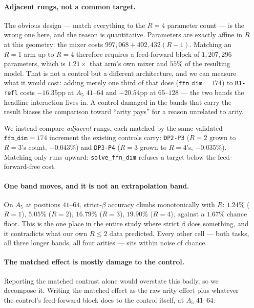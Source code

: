\documentclass[10pt,twocolumn]{article}
\begin{document}
\paragraph{Adjacent rungs, not a common target.} The obvious design --- match
everything to the $R{=}4$ parameter count --- is the wrong one here, and the
reason is quantitative. Parameters are exactly affine in $R$ at this geometry:
the mixer costs $997{,}068 + 402{,}432(R-1)$. Matching an $R{=}1$ arm up to
$R{=}4$ therefore requires a feed-forward block of $1{,}207{,}296$ parameters,
which is $1.21\times$ that arm's own mixer and $55\%$ of the resulting model.
That is not a control but a different architecture, and we can measure what it
would cost: adding merely one third of that dose ($\texttt{ffn\_dim}=174$) to
\texttt{R1-refl} costs $-16.35$pp at $A_5$ $41$--$64$ and $-20.54$pp at
$65$--$128$ --- the two bands the headline interaction lives in. A control
damaged in the bands that carry the result biases the comparison toward
``arity pays'' for a reason unrelated to arity.

We instead compare \emph{adjacent} rungs, each matched by the same validated
$\texttt{ffn\_dim}=174$ increment the existing controls carry: \texttt{DP2-P3}
($R{=}2$ grown to $R{=}3$'s count, $-0.043\%$) and \texttt{DP3-P4} ($R{=}3$ grown
to $R{=}4$'s, $-0.035\%$). Matching only runs upward: \texttt{solve\_ffn\_dim}
refuses a target below the feed-forward-free cost.

\paragraph{One band moves, and it is not an extrapolation band.} On $A_5$ at
positions $41$--$64$, strict-$\beta$ accuracy climbs monotonically with $R$:
$1.24\%$ ($R{=}1$), $5.05\%$ ($R{=}2$), $16.79\%$ ($R{=}3$), $19.90\%$ ($R{=}4$),
against a $1.67\%$ chance floor. This is the one place in the entire study where
strict $\beta$ does something, and it contradicts what our own $R\le2$ data
predicted. Every other cell --- both tasks, all three longer bands, all four
arities --- sits within noise of chance.

\paragraph{The matched effect is mostly damage to the control.} Reporting the
matched contrast alone would overstate this badly, so we decompose it. Writing
the matched effect as the raw arity effect plus whatever the control's
feed-forward block does to the control itself, at $A_5$ $41$--$64$:
\end{document}
